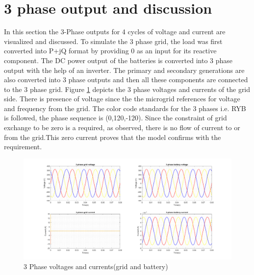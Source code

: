 \section{3 phase output and discussion}
In this section the 3-Phase outputs for 4 cycles of voltage and current are visualized and discussed. To simulate the 3 phase grid, the load was first converted into P+jQ format by providing 0 as an input for its reactive component. The DC power output of the batteries is converted into 3 phase output with the help of an inverter. The primary and secondary generations are also converted into 3 phase outputs and then all these components are connected to the 3 phase grid. Figure \ref{fig:3ph_grid_batt} depicts the 3 phase voltages and currents of the grid side. There is presence of voltage since the the microgrid references for voltage and frequency from the grid. The color code standards for the 3 phases i.e. RYB is followed, the phase sequence is (0,120,-120). Since the constraint of grid exchange to be zero is a required, as observed, there is no flow of current to or from the grid.This zero current proves that the model confirms with the requirement.
\begin{figure}[H]
    \centering
    \includegraphics[width=1.1 \linewidth]{Final_report/Images/3ph_grid_batt.png}
    \caption{3 Phase voltages and currents(grid and battery)}
    \label{fig:3ph_grid_batt}
\end{figure}

